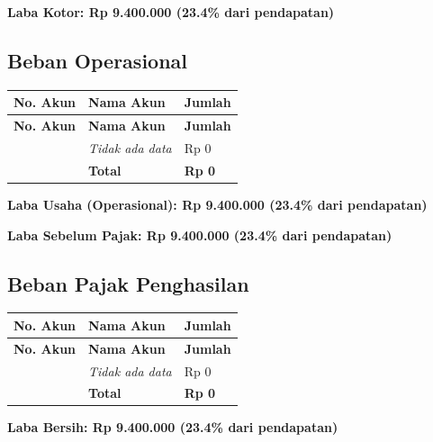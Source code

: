 \documentclass[11pt,a4paper]{article}
\begin{document}
\vspace{2pt}\noindent\colorbox{soft}{\parbox{\dimexpr\linewidth-2\fboxsep}{\textbf{Laba Kotor: Rp 9.400.000 (23.4\% dari pendapatan)}}}\vspace{4pt}

\subsection{Beban Operasional}
{\setlength{\tabcolsep}{5pt}
\begin{longtable}{l l R{3cm}}
\toprule
\textbf{No. Akun} & \textbf{Nama Akun} & \textbf{Jumlah} \\
\midrule\endfirsthead
\toprule
\textbf{No. Akun} & \textbf{Nama Akun} & \textbf{Jumlah} \\
\midrule\endhead
\bottomrule\endfoot
 & \textit{Tidak ada data} & Rp 0 \\
 & \textbf{Total} & \textbf{Rp 0} \\
\end{longtable}}

\vspace{2pt}\noindent\colorbox{soft}{\parbox{\dimexpr\linewidth-2\fboxsep}{\textbf{Laba Usaha (Operasional): Rp 9.400.000 (23.4\% dari pendapatan)}}}\vspace{4pt}

\vspace{2pt}\noindent\colorbox{soft}{\parbox{\dimexpr\linewidth-2\fboxsep}{\textbf{Laba Sebelum Pajak: Rp 9.400.000 (23.4\% dari pendapatan)}}}\vspace{4pt}

\subsection{Beban Pajak Penghasilan}
{\setlength{\tabcolsep}{5pt}
\begin{longtable}{l l R{3cm}}
\toprule
\textbf{No. Akun} & \textbf{Nama Akun} & \textbf{Jumlah} \\
\midrule\endfirsthead
\toprule
\textbf{No. Akun} & \textbf{Nama Akun} & \textbf{Jumlah} \\
\midrule\endhead
\bottomrule\endfoot
 & \textit{Tidak ada data} & Rp 0 \\
 & \textbf{Total} & \textbf{Rp 0} \\
\end{longtable}}

\vspace{2pt}\noindent\colorbox{soft}{\parbox{\dimexpr\linewidth-2\fboxsep}{\textbf{Laba Bersih: Rp 9.400.000 (23.4\% dari pendapatan)}}}\vspace{4pt}
\end{document}
